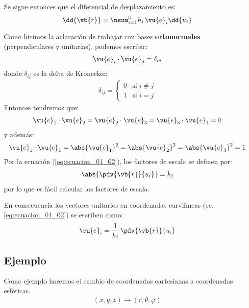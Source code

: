 \par
Se sigue entonces que el diferencial de desplazamiento es:
\begin{align*}
\dd{\vb{r}} = \nsum_{i=1}^{3} h_{i} \, \vu{e}_{i} \dd{u_{i}}
\end{align*}
\par
Como hicimos la aclaración de trabajar con bases \textbf{ortonormales} (perpendiculares y unitarias), podemos escribir:
\begin{align}
\vu{e}_{i} \cdot \vu{e}_{j} = \delta_{ij}
\label{eq:ecuacion_01_03}
\end{align}
donde $\delta_{ij}$ es la delta de Kronecker:
\begin{align*}
\delta_{ij} = 
\begin{cases}
0 & \mbox{si } i \neq j \\
1 & \mbox{si } i = j
\end{cases}
\end{align*}
Entonces tendremos que:
\begin{align*}
\vu{e}_{1} \cdot \vu{e}_{2} = \vu{e}_{2} \cdot \vu{e}_{3} = \vu{e}_{3} \cdot \vu{e}_{1} = 0  
\end{align*}
y además:
\begin{align*}
\vu{e}_{1} \cdot \vu{e}_{1} = \abs{\vu{e}_{1}}^{2} = \abs{\vu{e}_{2}}^{2} = \abs{\vu{e}_{3}}^{2} = 1
\end{align*}
Por la ecuación (\ref{eq:ecuacion_01_02}), los factores de escala se definen por:
\begin{align}
\abs{\pdv{\vb{r}}{u_{i}}} = h_{i}
\label{eq:ecuacion_01_04}
\end{align}
por lo que es fácil calcular los factores de escala.
\par
En consecuencia los vectores unitarios en coordenadas curvilíneas (ec. \ref{eq:ecuacion_01_02}) se escriben como:
\begin{align}
\vu{e}_{i} = \dfrac{1}{h_{i}} \, \pdv{\vb{r}}{u_{i}}
\label{eq:ecuacion_01_05}
\end{align}

\subsection*{Ejemplo}

Como ejemplo haremos el cambio de coordenadas cartesianas a coordenadas esféricas.
\begin{align*}
(x, y, z) \longrightarrow (r, \theta, \varphi)
\end{align*}

